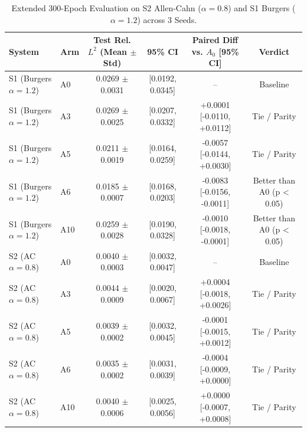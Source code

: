 \begin{table}[t]
\centering
\small
\caption{Extended 300-Epoch Evaluation on S2 Allen-Cahn ($\alpha=0.8$) and S1 Burgers ($\alpha=1.2$) across 3 Seeds.}
\label{tab:p1_300epoch}
\begin{tabular}{llcccc}
\toprule
System & Arm & Test Rel. $L^2$ (Mean $\pm$ Std) & 95\% CI & Paired Diff vs. $A_0$ [95\% CI] & Verdict \\
\midrule
S1 (Burgers $\alpha=1.2$) & A0 & 0.0269 $\pm$ 0.0031 & [0.0192, 0.0345] & -- & Baseline \\
S1 (Burgers $\alpha=1.2$) & A3 & 0.0269 $\pm$ 0.0025 & [0.0207, 0.0332] & +0.0001 [-0.0110, +0.0112] & Tie / Parity \\
S1 (Burgers $\alpha=1.2$) & A5 & 0.0211 $\pm$ 0.0019 & [0.0164, 0.0259] & -0.0057 [-0.0144, +0.0030] & Tie / Parity \\
S1 (Burgers $\alpha=1.2$) & A6 & 0.0185 $\pm$ 0.0007 & [0.0168, 0.0203] & -0.0083 [-0.0156, -0.0011] & Better than A0 (p < 0.05) \\
S1 (Burgers $\alpha=1.2$) & A10 & 0.0259 $\pm$ 0.0028 & [0.0190, 0.0328] & -0.0010 [-0.0018, -0.0001] & Better than A0 (p < 0.05) \\
S2 (AC $\alpha=0.8$) & A0 & 0.0040 $\pm$ 0.0003 & [0.0032, 0.0047] & -- & Baseline \\
S2 (AC $\alpha=0.8$) & A3 & 0.0044 $\pm$ 0.0009 & [0.0020, 0.0067] & +0.0004 [-0.0018, +0.0026] & Tie / Parity \\
S2 (AC $\alpha=0.8$) & A5 & 0.0039 $\pm$ 0.0002 & [0.0032, 0.0045] & -0.0001 [-0.0015, +0.0012] & Tie / Parity \\
S2 (AC $\alpha=0.8$) & A6 & 0.0035 $\pm$ 0.0002 & [0.0031, 0.0039] & -0.0004 [-0.0009, +0.0000] & Tie / Parity \\
S2 (AC $\alpha=0.8$) & A10 & 0.0040 $\pm$ 0.0006 & [0.0025, 0.0056] & +0.0000 [-0.0007, +0.0008] & Tie / Parity \\
\bottomrule
\end{tabular}
\end{table}
